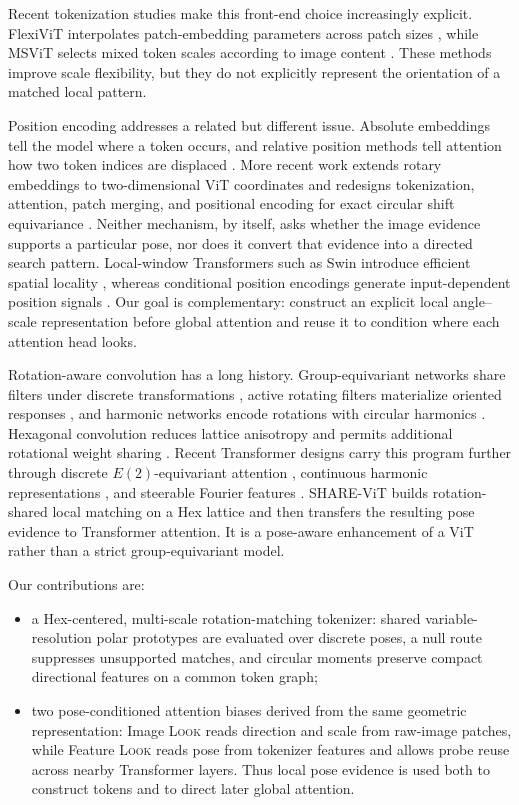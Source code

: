 \documentclass[10pt]{article}
\newcommand{\method}{SHARE-ViT}
\newcommand{\look}{\textsc{Look}}
\begin{document}
Recent tokenization studies make this front-end choice increasingly explicit.
FlexiViT interpolates patch-embedding parameters across patch sizes
\citep{beyer2023flexivit}, while MSViT selects mixed token scales according to
image content \citep{havtorn2023msvit}. These methods improve scale flexibility,
but they do not explicitly represent the orientation of a matched local
pattern.

Position encoding addresses a related but different issue. Absolute
embeddings tell the model where a token occurs, and relative position methods
tell attention how two token indices are displaced \citep{wu2021irpe}.
More recent work extends rotary embeddings to two-dimensional ViT coordinates
\citep{heo2024ropevit} and redesigns tokenization, attention, patch merging,
and positional encoding for exact circular shift equivariance
\citep{rojasgomez2024shiftequiv}.
Neither mechanism, by itself, asks whether the image evidence supports a
particular pose, nor does it convert that evidence into a directed search
pattern. Local-window Transformers such as Swin introduce efficient spatial
locality \citep{liu2021swin}, whereas conditional position encodings generate
input-dependent position signals \citep{chu2021cpvt}. Our goal is
complementary: construct an explicit local angle--scale representation before
global attention and reuse it to condition where each attention head looks.

Rotation-aware convolution has a long history. Group-equivariant networks
share filters under discrete transformations \citep{cohen2016gcnn}, active
rotating filters materialize oriented responses \citep{zhou2017orn}, and
harmonic networks encode rotations with circular harmonics
\citep{worrall2017harmonic}. Hexagonal convolution reduces lattice anisotropy
and permits additional rotational weight sharing \citep{hoogeboom2018hexaconv}.
Recent Transformer designs carry this program further through discrete
$E(2)$-equivariant attention \citep{xu2023e2vit}, continuous harmonic
representations \citep{karella2024harmformer}, and steerable Fourier features
\citep{kundu2025steerable}.
\method{} builds rotation-shared local matching on a Hex lattice and then
transfers the resulting pose evidence to Transformer attention. It is a
pose-aware enhancement of a ViT rather than a strict group-equivariant model.

Our contributions are:
\begin{itemize}
  \item a Hex-centered, multi-scale rotation-matching tokenizer: shared
  variable-resolution polar prototypes are evaluated over discrete poses, a
  null route suppresses unsupported matches, and circular moments preserve
  compact directional features on a common token graph;
  \item two pose-conditioned attention biases derived from the same geometric
  representation: Image \look{} reads direction and scale from raw-image
  patches, while Feature \look{} reads pose from tokenizer features and allows
  probe reuse across nearby Transformer layers. Thus local pose evidence is
  used both to construct tokens and to direct later global attention.
\end{itemize}
\end{document}
